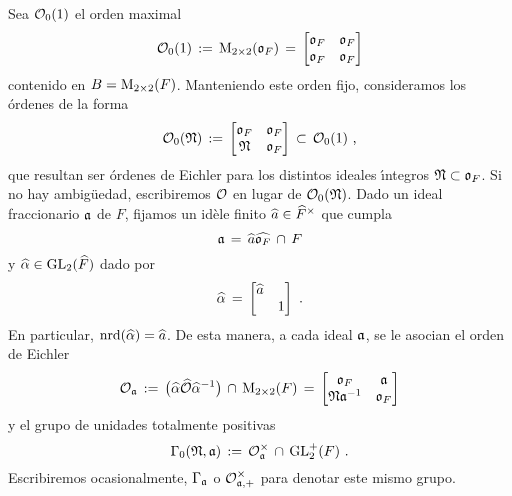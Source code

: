 Sea $\cal{O}_{0}(1)$ el orden maximal
\begin{equation}
	\label{eq:ordenmaximalmatrices}
	\cal{O}_{0}(1) \,:=\, \MM_{2\times 2}(\oka{F}) \,=\,
	\begin{bmatrix} \oka{F} & \oka{F} \\ \oka{F} & \oka{F} \end{bmatrix}
\end{equation}
%
contenido en $B=\MM_{2\times 2}(F)$. Manteniendo este orden fijo,
consideramos los \'{o}rdenes de la forma
\begin{equation}
	\label{eq:ordendeeichlermatrices}
	\cal{O}_{0}(\frak{N}) \,:=\,
	\begin{bmatrix} \oka{F} & \oka{F} \\ \frak{N} & \oka{F} \end{bmatrix}
		\,\subset\,\cal{O}_{0}(1)
		\text{ ,}
\end{equation}
%
que resultan ser \'{o}rdenes de Eichler para los distintos ideales
\'{\i}ntegros $\frak{N}\subset\oka{F}$. Si no hay ambig\"{u}edad, escribiremos
$\cal{O}$ en lugar de $\cal{O}_{0}(\frak{N})$. Dado un ideal fraccionario
$\frak{a}$ de $F$, fijamos un id\`{e}le finito $\hhat{a}\in\Idfin{F}$ que
cumpla
\begin{equation}
	\label{eq:ideleasociadomatrices}
	\frak{a} \,=\,\hhat{a}\Adfin{\oka{F}}\,\cap\,F
\end{equation}
%
y $\hhat{\alpha}\in\GL_{2}(\Adfin{F})$ dado por
\begin{equation}
	\label{eq:matrizasociadaaidelematrices}
	\hhat{\alpha} \,=\,\begin{bmatrix} \hhat{a} & \\ & 1 \end{bmatrix}
	\text{ .}
\end{equation}
%
En particular, $\nrd(\hhat{\alpha})=\hhat{a}$. De esta manera, a cada ideal
$\frak{a}$, se le asocian el orden de Eichler
\begin{equation}
	\label{eq:ordenasociadomatrices}
	\cal{O}_{\frak{a}} \,:=\,\big(\hhat{\alpha}\Adfin{\cal{O}}
			\hhat{\alpha}^{-1}\big)\,\cap\,\MM_{2\times 2}(F)
		\,=\,\begin{bmatrix} \oka{F} & \frak{a} \\
			\frak{N}\frak{a}^{-1} & \oka{F}\end{bmatrix}
\end{equation}
%
y el grupo de unidades totalmente positivas
\begin{equation}
	\label{eq:unidadestotalmentepositivasasociadasmatrices}
	\Gamma_{0}(\frak{N},\frak{a}) \,:=\,
		\cal{O}_{\frak{a}}^{\times}\,\cap\,\GLtp_{2}(F)
	\text{ .}
\end{equation}
%
Escribiremos ocasionalmente, $\Gamma_{\frak{a}}$ o
$\cal{O}_{\frak{a},+}^{\times}$ para denotar este mismo grupo.


